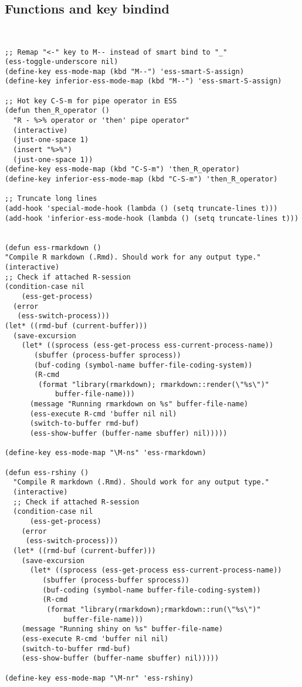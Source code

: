 \documentclass[11pt]{article}
\begin{document}
\subsection{Functions and key bindind}
\label{sec:org3ea002b}
\begin{verbatim}


;; Remap "<-" key to M-- instead of smart bind to "_"
(ess-toggle-underscore nil)
(define-key ess-mode-map (kbd "M--") 'ess-smart-S-assign)
(define-key inferior-ess-mode-map (kbd "M--") 'ess-smart-S-assign)

;; Hot key C-S-m for pipe operator in ESS
(defun then_R_operator ()
  "R - %>% operator or 'then' pipe operator"
  (interactive)
  (just-one-space 1)
  (insert "%>%")
  (just-one-space 1))
(define-key ess-mode-map (kbd "C-S-m") 'then_R_operator)
(define-key inferior-ess-mode-map (kbd "C-S-m") 'then_R_operator)

;; Truncate long lines
(add-hook 'special-mode-hook (lambda () (setq truncate-lines t)))
(add-hook 'inferior-ess-mode-hook (lambda () (setq truncate-lines t)))


(defun ess-rmarkdown ()
"Compile R markdown (.Rmd). Should work for any output type."
(interactive)
;; Check if attached R-session
(condition-case nil
    (ess-get-process)
  (error
   (ess-switch-process)))
(let* ((rmd-buf (current-buffer)))
  (save-excursion
    (let* ((sprocess (ess-get-process ess-current-process-name))
	   (sbuffer (process-buffer sprocess))
	   (buf-coding (symbol-name buffer-file-coding-system))
	   (R-cmd
	    (format "library(rmarkdown); rmarkdown::render(\"%s\")"
		    buffer-file-name)))
      (message "Running rmarkdown on %s" buffer-file-name)
      (ess-execute R-cmd 'buffer nil nil)
      (switch-to-buffer rmd-buf)
      (ess-show-buffer (buffer-name sbuffer) nil)))))

(define-key ess-mode-map "\M-ns" 'ess-rmarkdown)

(defun ess-rshiny ()
  "Compile R markdown (.Rmd). Should work for any output type."
  (interactive)
  ;; Check if attached R-session
  (condition-case nil
      (ess-get-process)
    (error
     (ess-switch-process)))
  (let* ((rmd-buf (current-buffer)))
    (save-excursion
      (let* ((sprocess (ess-get-process ess-current-process-name))
	     (sbuffer (process-buffer sprocess))
	     (buf-coding (symbol-name buffer-file-coding-system))
	     (R-cmd
	      (format "library(rmarkdown);rmarkdown::run(\"%s\")"
		      buffer-file-name)))
	(message "Running shiny on %s" buffer-file-name)
	(ess-execute R-cmd 'buffer nil nil)
	(switch-to-buffer rmd-buf)
	(ess-show-buffer (buffer-name sbuffer) nil)))))

(define-key ess-mode-map "\M-nr" 'ess-rshiny)

\end{verbatim}
\end{document}
